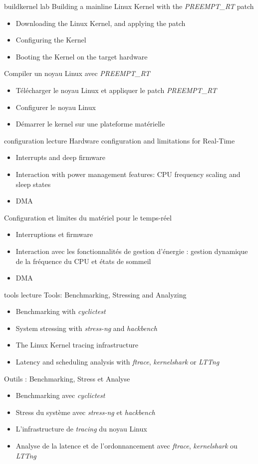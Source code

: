 {buildkernel}
{lab}
{Building a mainline Linux Kernel with the {\em PREEMPT\_RT} patch}
{
  \begin{itemize}
  \item Downloading the Linux Kernel, and applying the patch
  \item Configuring the Kernel
  \item Booting the Kernel on the target hardware
 \end{itemize}
}
{Compiler un noyau Linux avec {\em PREEMPT\_RT}}
{
  \begin{itemize}
  \item Télécharger le noyau Linux et appliquer le patch {\em PREEMPT\_RT}
  \item Configurer le noyau Linux
  \item Démarrer le kernel sur une plateforme matérielle
 \end{itemize}
}
{configuration}
{lecture}
{Hardware configuration and limitations for Real-Time}
{
  \begin{itemize}
  \item Interrupts and deep firmware
  \item Interaction with power management features: CPU frequency
    scaling and sleep states
  \item DMA
  \end{itemize}
}
{Configuration et limites du matériel pour le temps-réel}
{
  \begin{itemize}
  \item Interruptions et firmware
  \item Interaction avec les fonctionnalités de gestion d'énergie :
    gestion dynamique de la fréquence du CPU et états de sommeil
  \item DMA
  \end{itemize}
}
{tools}
{lecture}
{Tools: Benchmarking, Stressing and Analyzing}
{
  \begin{itemize}
  \item Benchmarking with {\em cyclictest}
  \item System stressing with {\em stress-ng} and {\em hackbench}
  \item The Linux Kernel tracing infrastructure
  \item Latency and scheduling analysis with {\em ftrace}, {\em
      kernelshark} or {\em LTTng}
  \end{itemize}
}
{Outils : Benchmarking, Stress et Analyse}
{
  \begin{itemize}
  \item Benchmarking avec {\em cyclictest}
  \item Stress du système avec {\em stress-ng} et {\em hackbench}
  \item L'infrastructure de {\em tracing} du noyau Linux
  \item Analyse de la latence et de l'ordonnancement avec {\em
      ftrace}, {\em kernelshark} ou {\em LTTng}
  \end{itemize}
}
